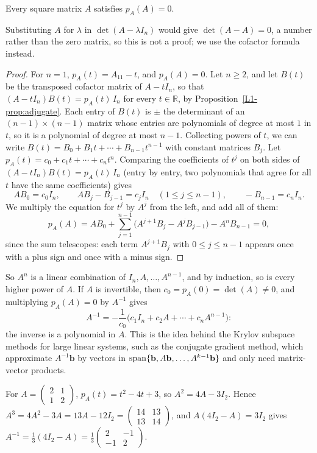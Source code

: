 \begin{theorem}\label{L1-thm:cayley-hamilton}
    Every square matrix $A$ satisfies $p_A(A) = 0$.
\end{theorem}

Substituting $A$ for $\lambda$ in $\det(A - \lambda I_n)$ would give $\det(A - A) = 0$, a number rather than the zero matrix, so this is not a proof; we use the cofactor formula instead.

\begin{proof}
    For $n = 1$, $p_A(t) = A_{11} - t$, and $p_A(A) = 0$. Let $n \geq 2$, and let $B(t)$ be the transposed cofactor matrix of $A - tI_n$, so that $(A - tI_n)B(t) = p_A(t)\, I_n$ for every $t \in \mathbb{R}$, by Proposition~\ref{L1-prop:adjugate}. Each entry of $B(t)$ is $\pm$ the determinant of an $(n - 1) \times (n - 1)$ matrix whose entries are polynomials of degree at most $1$ in $t$, so it is a polynomial of degree at most $n - 1$. Collecting powers of $t$, we can write $B(t) = B_0 + B_1t + \cdots + B_{n-1}t^{n-1}$ with constant matrices $B_j$. Let $p_A(t) = c_0 + c_1t + \cdots + c_nt^n$. Comparing the coefficients of $t^j$ on both sides of $(A - tI_n)B(t) = p_A(t)\, I_n$ (entry by entry, two polynomials that agree for all $t$ have the same coefficients) gives
    \[AB_0 = c_0I_n, \qquad AB_j - B_{j-1} = c_jI_n \quad (1 \leq j \leq n - 1), \qquad -B_{n-1} = c_nI_n.\]
    We multiply the equation for $t^j$ by $A^j$ from the left, and add all of them:
    \[p_A(A) = AB_0 + \sum_{j=1}^{n-1}\big(A^{j+1}B_j - A^jB_{j-1}\big) - A^nB_{n-1} = 0,\]
    since the sum telescopes: each term $A^{j+1}B_j$ with $0 \leq j \leq n - 1$ appears once with a plus sign and once with a minus sign.
\end{proof}

So $A^n$ is a linear combination of $I_n, A, \ldots, A^{n-1}$, and by induction, so is every higher power of $A$. If $A$ is invertible, then $c_0 = p_A(0) = \det(A) \neq 0$, and multiplying $p_A(A) = 0$ by $A^{-1}$ gives
\[A^{-1} = -\frac{1}{c_0}\big(c_1I_n + c_2A + \cdots + c_nA^{n-1}\big):\]
the inverse is a polynomial in $A$. This is the idea behind the Krylov subspace methods for large linear systems, such as the conjugate gradient method, which approximate $A^{-1}\mathbf{b}$ by vectors in $\operatorname{span}\{\mathbf{b}, A\mathbf{b}, \ldots, A^{k-1}\mathbf{b}\}$ and only need matrix-vector products.

\begin{example}\label{L1-ex:cayley-hamilton}
    For $A = \begin{pmatrix} 2 & 1 \\ 1 & 2 \end{pmatrix}$, $p_A(t) = t^2 - 4t + 3$, so $A^2 = 4A - 3I_2$. Hence $A^3 = 4A^2 - 3A = 13A - 12I_2 = \begin{pmatrix} 14 & 13 \\ 13 & 14 \end{pmatrix}$, and $A(4I_2 - A) = 3I_2$ gives $A^{-1} = \frac{1}{3}(4I_2 - A) = \frac{1}{3}\begin{pmatrix} 2 & -1 \\ -1 & 2 \end{pmatrix}$.
\end{example}


